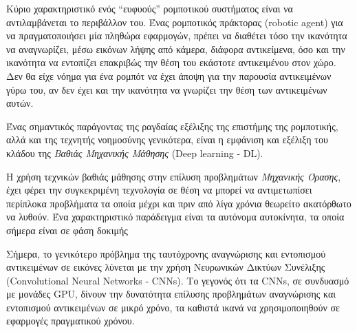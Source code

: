 Κύριο χαρακτηριστικό ενός “ευφυούς” ρομποτικού συστήματος είναι να αντιλαμβάνεται
το περιβάλλον του.
Ένας ρομποτικός πράκτορας (robotic agent) για να πραγματοποιήσει μία πληθώρα
εφαρμογών, πρέπει να διαθέτει τόσο την
ικανότητα να αναγνωρίζει, μέσω εικόνων λήψης από κάμερα, διάφορα αντικείμενα,
όσο και την ικανότητα να εντοπίζει επακριβώς την θέση του
εκάστοτε αντικειμένου στον χώρο. Δεν θα είχε νόημα για ένα ρομπότ να έχει άποψη
για την παρουσία αντικειμένων γύρω του, αν δεν έχει και την ικανότητα να γνωρίζει
την θέση των αντικειμένων αυτών. %

Ένας σημαντικός παράγοντας της ραγδαίας εξέλιξης της επιστήμης της ρομποτικής, αλλά
και της τεχνητής νοημοσύνης γενικότερα, είναι η εμφάνιση και εξέλιξη του κλάδου
της \emph{Βαθιάς Μηχανικής Μάθησης} (Deep learning - DL).

Η χρήση τεχνικών βαθιάς μάθησης στην επίλυση προβλημάτων \emph{Μηχανικής Όρασης},
έχει φέρει την συγκεκριμένη τεχνολογία σε θέση να μπορεί να αντιμετωπίσει
περίπλοκα προβλήματα τα οποία μέχρι και πριν από λίγα χρόνια θεωρείτο ακατόρθωτο να λυθούν.
Ένα χαρακτηριστικό παράδειγμα είναι τα αυτόνομα αυτοκίνητα, τα οποία σήμερα είναι σε
φάση δοκιμής %

Σήμερα, το γενικότερο πρόβλημα της ταυτόχρονης αναγνώρισης και εντοπισμού αντικειμένων σε εικόνες
λύνεται με την χρήση Νευρωνικών Δικτύων Συνέλιξης (Convolutional Neural Networks - CNNs).
Το γεγονός ότι τα CNΝs, σε συνδυασμό με μονάδες GPU, δίνουν την δυνατότητα
επίλυσης προβλημάτων αναγνώρισης και εντοπισμού αντικειμένων σε μικρό χρόνο,
τα καθιστά ικανά να χρησιμοποιηθούν σε εφαρμογές πραγματικού χρόνου.




